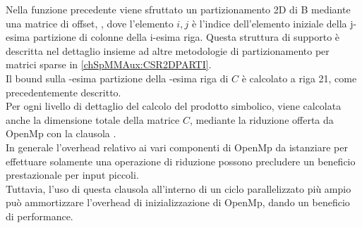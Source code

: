 Nella funzione precedente viene sfruttato un partizionamento 2D di B mediante una matrice di offset, ,
dove l'elemento $i,j$ è l'indice dell'elemento \nnz iniziale della 
j-esima partizione di colonne della i-esima riga.
Questa struttura di supporto è descritta nel dettaglio insieme ad altre metodologie di partizionamento 
per matrici sparse in \ref{chSpMMAux:CSR2DPARTI}.\\
Il bound sulla -esima partizione della -esima riga di $C$ 
è calcolato a riga 21, come precedentemente descritto.\\ 
\label{chSpMMSymb:OMPSetupCosts}
Per ogni livello di dettaglio del calcolo del prodotto simbolico, viene calcolata anche la dimensione
totale della matrice $C$, mediante la riduzione offerta da OpenMp con la clausola .\\
In generale l'overhead relativo ai vari componenti di OpenMp da istanziare per effettuare solamente
una operazione di riduzione possono precludere un beneficio prestazionale per input piccoli.
\\Tuttavia, l'uso di questa clausola all'interno di un ciclo parallelizzato più ampio può ammortizzare
l'overhead di inizializzazione di OpenMp, dando un beneficio di performance.\\



